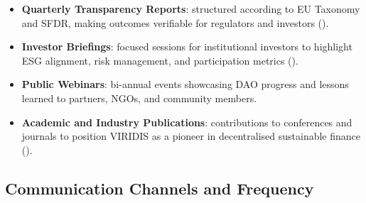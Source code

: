 \documentclass[
  english,
  12pt,
  oneside,
  open=any]{scrbook}
\providecommand{\tightlist}{%
  \setlength{\itemsep}{0pt}\setlength{\parskip}{0pt}}\usepackage{longtable,booktabs,array}
\begin{document}
\begin{itemize}
\tightlist
\item
  \textbf{Quarterly Transparency Reports}: structured according to EU
  Taxonomy and SFDR, making outcomes verifiable for regulators and
  investors
  ().\\
\item
  \textbf{Investor Briefings}: focused sessions for institutional
  investors to highlight ESG alignment, risk management, and
  participation metrics
  ().\\
\item
  \textbf{Public Webinars}: bi-annual events showcasing DAO progress and
  lessons learned to partners, NGOs, and community members.\\
\item
  \textbf{Academic and Industry Publications}: contributions to
  conferences and journals to position VIRIDIS as a pioneer in
  decentralised sustainable finance
  ().
\end{itemize}

\subsection{Communication Channels and
Frequency}\label{communication-channels-and-frequency}
\end{document}

